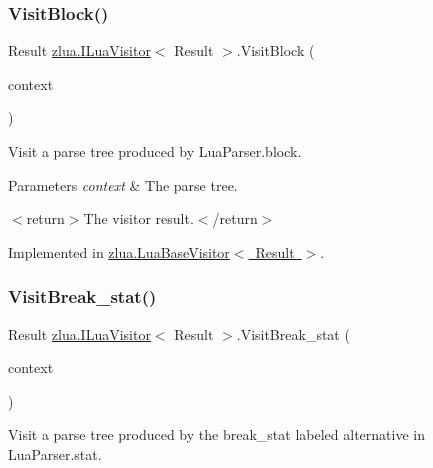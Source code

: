 \subsubsection{\texorpdfstring{Visit\+Block()}{VisitBlock()}}
{\footnotesize\ttfamily Result \mbox{\hyperlink{interfacezlua_1_1_i_lua_visitor}{zlua.\+I\+Lua\+Visitor}}$<$ Result $>$.Visit\+Block (\begin{DoxyParamCaption}\item[{\mbox{[}\+Not\+Null\mbox{]} \mbox{\hyperlink{classzlua_1_1_lua_parser_1_1_block_context}{Lua\+Parser.\+Block\+Context}}}]{context }\end{DoxyParamCaption})}



Visit a parse tree produced by Lua\+Parser.\+block. 


\begin{DoxyParams}{Parameters}
{\em context} & The parse tree.\\
\hline
\end{DoxyParams}
$<$return$>$The visitor result.$<$/return$>$ 

Implemented in \mbox{\hyperlink{classzlua_1_1_lua_base_visitor_ad48d1aadd0185f15f13db086072bbe08}{zlua.\+Lua\+Base\+Visitor$<$ Result $>$}}.

\mbox{\label{interfacezlua_1_1_i_lua_visitor_a858a13af948cd9098b3e70456040f96a}} 
\subsubsection{\texorpdfstring{Visit\+Break\+\_\+stat()}{VisitBreak\_stat()}}
{\footnotesize\ttfamily Result \mbox{\hyperlink{interfacezlua_1_1_i_lua_visitor}{zlua.\+I\+Lua\+Visitor}}$<$ Result $>$.Visit\+Break\+\_\+stat (\begin{DoxyParamCaption}\item[{\mbox{[}\+Not\+Null\mbox{]} \mbox{\hyperlink{classzlua_1_1_lua_parser_1_1_break__stat_context}{Lua\+Parser.\+Break\+\_\+stat\+Context}}}]{context }\end{DoxyParamCaption})}



Visit a parse tree produced by the {\ttfamily break\+\_\+stat} labeled alternative in Lua\+Parser.\+stat. 


